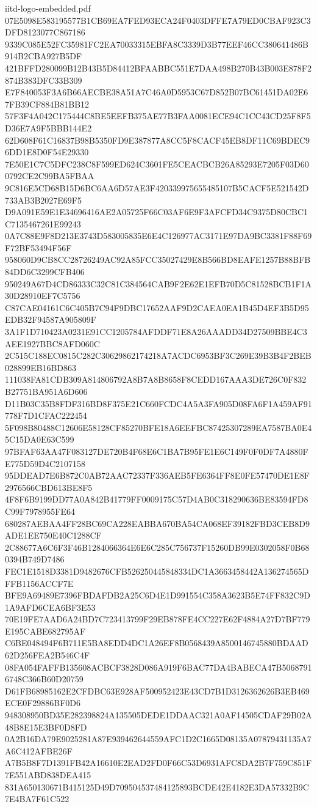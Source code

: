 \begin{filecontents*}[overwrite]{iitd-logo-embedded.pdf}
07E5098E583195577B1CB69EA7FED93ECA24F0403DFFE7A79ED0CBAF923C3DFD8123077C867186
9339C085E52FC35981FC2EA70033315EBFA8C3339D3B77EEF46CC380641486B914B2CBA927B5DF
421BFFD280099B12B43B5D84412BFAABBC551E7DAA498B270B43B003E878F2874B383DFC33B309
E7F840053F3A6B66AECBE38A51A7C46A0D5953C67D852B07BC61451DA02E67FB39CF884B81BB12
57F3F4A042C175444C8BE5EEFB375AE77B3FAA0081ECE94C1CC43CD25F8F5D36E7A9F5BBB144E2
62D608F61C16837B98B5350FD9E387877A8CC5F8CACF45EB8DF11C69BDEC96DD1E8D0F54E29330
7E50E1C7C5DFC238C8F599ED624C3601FE5CEACBCB26A85293E7205F03D600792CE2C99BA5FBAA
9C816E5CD68B15D6BC6AA6D57AE3F420339975655485107B5CACF5E521542D733AB3B2027E69F5
D9A091E59E1E34696416AE2A05725F66C03AF6E9F3AFCFD34C9375D80CBC1C7135467261E99243
0A7C88E9F8D213E3743D583005835E6E4C126977AC3171E97DA9BC3381F88F69F72BF53494F56F
958060D9CB8CC28726249AC92A85FCC35027429E8B566BD8EAFE1257B88BFB84DD6C3299CFB406
950249A67D4CD86333C32C81C384564CAB9F2E62E1EFB70D5C81528BCB1F1A30D28910EF7C5756
C87CAE04161C6C405B7C94F9DBC17652AAF9D2CAEA0EA1B45D4EF3B5D95EDB32F94587A905809F
3A1F1D710423A0231E91CC1205784AFDDF71E8A26AAADD34D27509BBE4C3AEE1927BBC8AFD060C
2C515C188EC0815C282C30629862174218A7ACDC6953BF3C269E39B3B4F2BEB028899EB16BD863
111038FA81CDB309A814806792A8B7A8B8658F8CEDD167AAA3DE726C0F832B27751BA951A6D606
D11B03C35B8FDF316BD8F375E21C660FCDC4A5A3FA905D08FA6F1A459AF91778F7D1CFAC222454
5F098B80488C12606E58128CF85270BFE18A6EEFBC87425307289EA7587BA0E45C15DA0E63C599
97BFAF63AA47F083127DE720B4F68E6C1BA7B95FE1E6C149F0F0DF7A4880FE775D59D4C2107158
95DDEAD7E6B872C0AB72AAC72337F336AEB5FE6364FF8E0FE57470DE1E8F2976566CBD613BE8F5
4F8F6B9199DD77A0A842B41779FF0009175C57D4AB0C318290636BE83594FD8C99F7978955FE64
680287AEBAA4FF28BC69CA228EABBA670BA54CA068EF39182FBD3CEB8D9ADE1EE750E40C1288CF
2C88677A6C6F3F46B1284066364E6E6C285C756737F15260DB99E0302058F0B680394B749D7486
FEC1E1518D3381D9482676CFB526250445848334DC1A3663458442A136274565DFFB1156ACCF7E
BFE9A69489E7396FBDAFDB2A25C6D4E1D991554C358A3623B5E74FF832C9D1A9AFD6CEA6BF3E53
70E19FE7AAD6A24BD7C723413799F29EB878FE4CC227E62F4884A27D7BF779E195CABE682795AF
C6BE048494F6B711E5BA8EDD4DC1A26EF8B0568439A8500146745880BDAAD62D256FEA2B546C4F
08FA054FAFFB135608ACBCF3828D086A919F6BAC77DA4BABECA47B50687916748C366B60D20759
D61FB68985162E2CFDBC63E928AF500952423E43CD7B1D3126362626B3EB469ECE0F29886BF0D6
948308950BD35E282398824A135505DEDE1DDAAC321A0AF14505CDAF29B02A48B8E15E3BF0D8FD
0A2B16DA79E9025281A87E939462644559AFC1D2C1665D08135A07879431135A7A6C412AFBE26F
A7B5B8F7D1391FB42A16610E2EAD2FD0F66C53D6931AFC8DA2B7F759C851F7E551ABD838DEA415
831A650130671B415125D49D709504537484125893BCDE42E4182E3DA57332B9C7E4BA7F61C522

\end{filecontents*}
